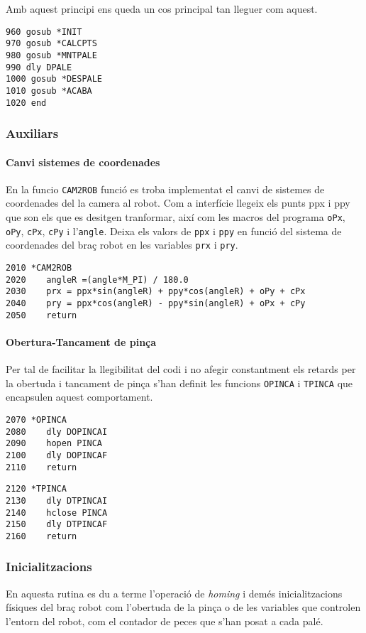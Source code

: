 Amb aquest principi ens queda un cos principal tan lleguer com aquest.
\begin{verbatim}
960 gosub *INIT
970 gosub *CALCPTS
980 gosub *MNTPALE
990 dly DPALE
1000 gosub *DESPALE
1010 gosub *ACABA
1020 end
\end{verbatim}

\subsubsection{Auxiliars}
\paragraph{Canvi sistemes de coordenades}
En la funcio \texttt{CAM2ROB} funció es troba implementat el canvi de sistemes
de coordenades del la camera al robot.
Com a interfície llegeix els punts ppx i ppy que son els que es desitgen
tranformar, així com les macros del programa \texttt{oPx}, \texttt{oPy},
\texttt{cPx}, \texttt{cPy} i l'\texttt{angle}. Deixa els valors de
\texttt{ppx} i \texttt{ppy} en funció del sistema de coordenades del braç
robot en les variables \texttt{prx} i \texttt{pry}.

\begin{verbatim}
2010 *CAM2ROB
2020 	angleR =(angle*M_PI) / 180.0
2030    prx = ppx*sin(angleR) + ppy*cos(angleR) + oPy + cPx
2040    pry = ppx*cos(angleR) - ppy*sin(angleR) + oPx + cPy
2050    return
\end{verbatim}

\paragraph{Obertura-Tancament de pinça}
Per tal de facilitar la llegibilitat del codi i no afegir constantment
els retards per la obertuda i tancament de pinça s'han definit les funcions
\texttt{OPINCA} i \texttt{TPINCA} que encapsulen aquest comportament.

\begin{verbatim}
2070 *OPINCA
2080    dly DOPINCAI
2090    hopen PINCA
2100    dly DOPINCAF
2110    return
\end{verbatim}
\begin{verbatim}
2120 *TPINCA
2130    dly DTPINCAI
2140    hclose PINCA
2150    dly DTPINCAF
2160    return
\end{verbatim}

\subsubsection{Inicialitzacions}
En aquesta rutina es du a terme l'operació de \emph{homing} i demés
inicialitzacions físiques del braç robot com l'obertuda de la pinça
o de les variables que controlen l'entorn del robot, com el 
contador de peces que s'han posat a cada palé.

